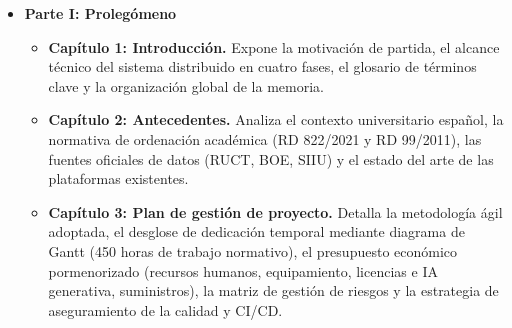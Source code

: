 \begin{itemize}
    \item \textbf{Parte I: Prolegómeno}
    \begin{itemize}
        \item \textbf{Capítulo 1: Introducción.} Expone la motivación de partida, el alcance técnico del sistema distribuido en cuatro fases, el glosario de términos clave y la organización global de la memoria.
        \item \textbf{Capítulo 2: Antecedentes.} Analiza el contexto universitario español, la normativa de ordenación académica (RD 822/2021 y RD 99/2011), las fuentes oficiales de datos (RUCT, BOE, SIIU) y el estado del arte de las plataformas existentes.
        \item \textbf{Capítulo 3: Plan de gestión de proyecto.} Detalla la metodología ágil adoptada, el desglose de dedicación temporal mediante diagrama de Gantt (450 horas de trabajo normativo), el presupuesto económico pormenorizado (recursos humanos, equipamiento, licencias e IA generativa, suministros), la matriz de gestión de riesgos y la estrategia de aseguramiento de la calidad y CI/CD.
    \end{itemize}


\end{itemize}
